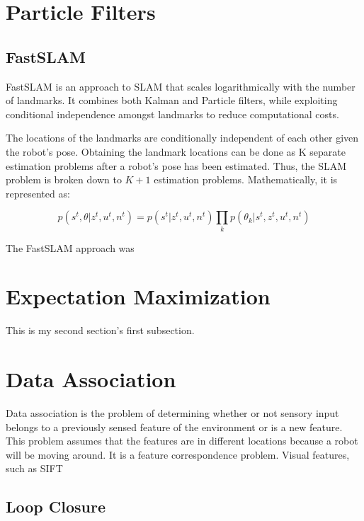 \documentclass[10pt,conference]{ieeeconf}
\begin{document}
\section {Particle Filters}

	

	
	\subsection{FastSLAM}
	
	
	FastSLAM \cite{montemerlo2002fastslam} is an approach to SLAM that scales logarithmically with the number of landmarks. It combines both Kalman and Particle filters, while exploiting conditional independence amongst landmarks to reduce computational costs.
	
	The locations of the landmarks are conditionally independent of each other given the robot's pose. Obtaining the landmark locations can be done as K separate estimation problems after a robot's pose has been estimated. Thus, the SLAM problem is broken down to $K+1$ estimation problems. Mathematically, it is represented as:
	
	\begin{equation}
	p(s^t, \theta | z^t, u^t, n^t) = p(s^t | z^t, u^t, n^t) \prod_k p(\theta_k | s^t, z^t, u^t, n^t)
	\end{equation}
	
	The FastSLAM approach was 

\section {Expectation Maximization}
    This is my second section's first subsection.
    
    
\section {Data Association}

	Data association is the problem of determining whether or not sensory input belongs to a previously sensed feature of the environment or is a new feature. This problem assumes that the features are in different locations because a robot will be moving around.
	It is a feature correspondence problem. 
	Visual features, such as SIFT
	
\subsection {Loop Closure}
\end{document}
